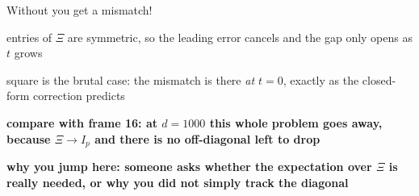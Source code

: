 \documentclass[aspectratio=169,11pt]{beamer}
\begin{document}
\begin{frame}{Without you get a mismatch!}
{\begin{notelist}
{      entries of $\Xi$ are symmetric, so the leading error cancels and the gap
      only opens as $t$ grows}
    \item square is the brutal case: the mismatch is there \emph{at $t = 0$},
      exactly as the closed-form correction predicts
    \item \textbf{compare with frame 16: at $d = 1000$ this whole problem goes
      away, because $\Xi \to I_p$ and there is no off-diagonal left to drop}
    \item \textbf{why you jump here: someone asks whether the expectation over
      $\Xi$ is really needed, or why you did not simply track the diagonal}
  \end{notelist}}
\end{frame}

\end{document}
